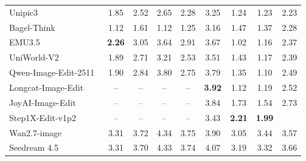 \begin{table}[t]
{\begin{tabular}{l|cccc|cccc}
            
            Unipic3~\cite{wei2026skywork}
            & 1.85 & 2.52 & 2.65 & \cellcolor[HTML]{C8C8C8}2.28 & 3.25 & 1.24 & 1.23
            & \cellcolor[HTML]{C8C8C8}2.23 \\

            Bagel-Think~\cite{deng2025emerging}
            & 1.12 & 1.61 & 1.12 & \cellcolor[HTML]{C8C8C8}1.25 & 3.16 & 1.47 & 1.37
            & \cellcolor[HTML]{C8C8C8} 2.28 \\

            EMU3.5~\cite{cui2025emu3}
            & \color[HTML]{F88825}\textbf{2.26} &  3.05  & 3.64 & \cellcolor[HTML]{C8C8C8}2.91 & 3.67 & 1.02 & 1.16
            & \cellcolor[HTML]{C8C8C8}2.37 \\

            

            UniWorld-V2~\cite{li2025uniworld}
            & 1.89 & 2.71 & 3.21 & \cellcolor[HTML]{C8C8C8}2.53 & 3.51 & 1.43 & 1.17
            & \cellcolor[HTML]{C8C8C8}2.39 \\

            Qwen-Image-Edit-2511~\cite{wu2025qwen}
            & 1.90 & 2.84 & 3.80 & \cellcolor[HTML]{C8C8C8}2.75 & 3.79 & 1.35 & 1.10
            & \cellcolor[HTML]{C8C8C8}2.49 \\

            Longcat-Image-Edit~\cite{team2025longcat}
            & -- & -- & -- & --
            & \color[HTML]{F88825}\textbf{3.92} & 1.12 & 1.19
            & \cellcolor[HTML]{C8C8C8}2.52 \\

            JoyAI-Image-Edit~\cite{joyaiimageedit}
            & -- & -- & -- & --
            &  3.84  & 1.73 & 1.54
            & \cellcolor[HTML]{C8C8C8}2.73 \\

            Step1X-Edit-v1p2~\cite{liu2025step1x}
            & -- & -- & -- & --
            & 3.43 & \color[HTML]{F88825}\textbf{2.21} & \color[HTML]{F88825}\textbf{1.99}
            & \cellcolor[HTML]{C8C8C8}{\color[HTML]{F88825}\textbf{2.76}} \\

           
        

            \midrule
            Wan2.7-image~\cite{nanobananapro}
            & 3.31 & 3.72 & 4.34 & \cellcolor[HTML]{C8C8C8}3.75 & 3.90 & 3.05 & 3.44
            & \cellcolor[HTML]{C8C8C8} 3.57 \\

            Seedream 4.5~\cite{seedream2025seedream}
            & 3.31 & 3.70 & 4.33 & \cellcolor[HTML]{C8C8C8}3.74 & 4.07 & 3.19 & 3.32
            & \cellcolor[HTML]{C8C8C8}3.66 \\


\end{tabular}}
\end{table}
